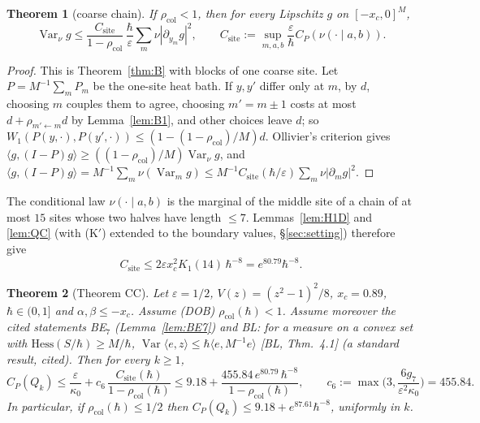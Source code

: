 \documentclass[11pt,a4paper]{article}
\newtheorem{theorem}{Theorem}[section]
\theoremstyle{definition}
\theoremstyle{remark}
\newcommand{\Var}{\operatorname{Var}}
\newcommand{\xc}{x_c}
\newcommand{\rcol}{\rho_{\mathrm{col}}}
\newcommand{\Csite}{C_{\mathrm{site}}}
\begin{document}
\begin{theorem}[coarse chain]\label{thm:C}
If $\rcol<1$, then for every Lipschitz $g$ on $[-\xc,0]^M$,
\[
\Var_\nu g\le\frac{\Csite}{1-\rcol}\,\frac{\hbar}{\varepsilon}\sum_m\nu|\partial_{y_m}g|^2,\qquad \Csite:=\sup_{m,a,b}\frac{\varepsilon}{\hbar}C_P(\nu(\cdot\mid a,b)).
\]
\end{theorem}
\begin{proof}
This is Theorem~\ref{thm:B} with blocks of one coarse site. Let $P=M^{-1}\sum_mP_m$ be the one-site heat bath. If $y,y'$ differ only at $m$, by $d$, choosing $m$ couples them to agree, choosing $m'=m\pm1$ costs at most $d+\rho_{m'\leftarrow m}d$ by Lemma~\ref{lem:B1}, and other choices leave $d$; so $W_1(P(y,\cdot),P(y',\cdot))\le(1-(1-\rcol)/M)d$. Ollivier's criterion gives $\langle g,(I-P)g\rangle\ge((1-\rcol)/M)\Var_\nu g$, and $\langle g,(I-P)g\rangle=M^{-1}\sum_m\nu(\Var_mg)\le M^{-1}\Csite(\hbar/\varepsilon)\sum_m\nu|\partial_mg|^2$.
\end{proof}

The conditional law $\nu(\cdot\mid a,b)$ is the marginal of the middle site of a chain of at most $15$ sites whose two halves have length $\le7$. Lemmas~\ref{lem:H1D} and \ref{lem:QC} (with (K$'$) extended to the boundary values, \S\ref{sec:setting}) therefore give
\begin{equation}\label{eq:Csite}
\Csite\le2\varepsilon\xc^2K_1(14)\,\hbar^{-8}=e^{80.79}\hbar^{-8}.
\end{equation}

\begin{theorem}[Theorem CC]\label{thm:CC}
Let $\varepsilon=1/2$, $V(z)=(z^2-1)^2/8$, $\xc=0.89$, $\hbar\in(0,1]$ and $\alpha,\beta\le-\xc$. Assume
\textup{(DOB)} $\rcol(\hbar)<1$.
Assume moreover the cited statements \textup{BE}$_7$ \textup{(}Lemma~\ref{lem:BE7}\textup{)} and \textup{BL}: for a measure on a convex set with $\mathrm{Hess}(S/\hbar)\ge M/\hbar$, $\Var\langle e,z\rangle\le\hbar\langle e,M^{-1}e\rangle$ [BL, Thm.~4.1] \textup{(}a standard result, cited\textup{)}. Then for every $k\ge1$,
\[
C_P(Q_k)\le\frac{\varepsilon}{\kappa_0}+c_6\,\frac{\Csite(\hbar)}{1-\rcol(\hbar)}\le 9.18+\frac{455.84\,e^{80.79}\,\hbar^{-8}}{1-\rcol(\hbar)},\qquad c_6:=\max\Big(3,\frac{6g_7}{\varepsilon^2\kappa_0}\Big)=455.84 .
\]
In particular, if $\rcol(\hbar)\le1/2$ then $C_P(Q_k)\le9.18+e^{87.61}\hbar^{-8}$, uniformly in $k$.
\end{theorem}
\end{document}
